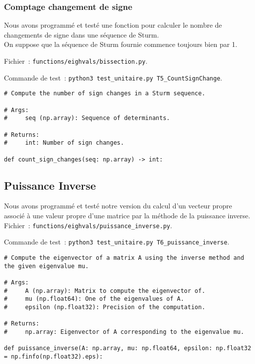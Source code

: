 \documentclass{article}
\begin{document}
\subsubsection{Comptage changement de signe}

Nous avons programmé et testé une fonction pour calculer le nombre de changements de signe dans une séquence de Sturm. \\
On suppose que la séquence de Sturm fournie commence toujours bien par 1.

Fichier~: \texttt{functions/eighvals/bissection.py}.

Commande de test~: \texttt{python3 test\_unitaire.py T5\_CountSignChange}.

\begin{small}
\begin{verbatim}
# Compute the number of sign changes in a Sturm sequence.

# Args:
#     seq (np.array): Sequence of determinants.

# Returns:
#     int: Number of sign changes.

def count_sign_changes(seq: np.array) -> int:
\end{verbatim}
\end{small}

\subsection{Puissance Inverse}

Nous avons programmé et testé notre version du calcul d'un vecteur propre associé à une valeur propre d'une matrice par la méthode de la puissance inverse. \\

Fichier~: \texttt{functions/eighvals/puissance\_inverse.py}.

Commande de test~: \texttt{python3 test\_unitaire.py T6\_puissance\_inverse}.

\begin{small}
\begin{verbatim}
# Compute the eigenvector of a matrix A using the inverse method and the given eigenvalue mu.

# Args:
#     A (np.array): Matrix to compute the eigenvector of.
#     mu (np.float64): One of the eigenvalues of A.
#     epsilon (np.float32): Precision of the computation.

# Returns:
#     np.array: Eigenvector of A corresponding to the eigenvalue mu.

def puissance_inverse(A: np.array, mu: np.float64, epsilon: np.float32 = np.finfo(np.float32).eps):
\end{verbatim}
\end{small}
\end{document}
